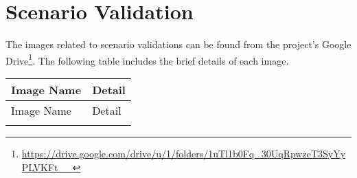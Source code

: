 \chapter{Scenario Validation}\label{appendix_b}

\sloppy
The images related to scenario validations can be found from the project's Google Drive\footnote {\url{https://drive.google.com/drive/u/1/folders/1uTl1b0Fq_30UqRpwzeT3SyYyPLVKFt__}}. The following table includes the brief details of each image.

\begin{longtable}{|p{}|p{}|}
\hline
Image Name & Detail \\
\hline
\endfirsthead

\hline
Image Name & Detail \\
\hline
\endhead

\hline
\endfoot

\hline
\endlastfoot


\end{longtable}


